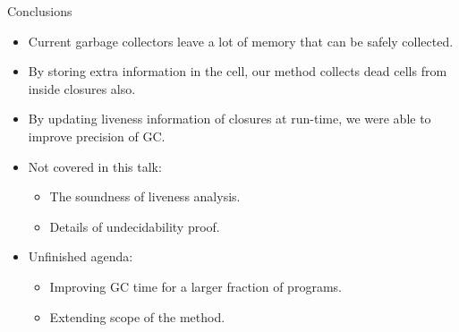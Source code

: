 \documentclass[xcolor=x11names,compress,mathserif]{beamer}
\renewcommand{\(}{\begin{columns}}
\renewcommand{\)}{\end{columns}}
\newcommand{\<}[1]{\begin{column}{#1}}
\renewcommand{\>}{\end{column}}
\begin{document}
\begin{frame}{Conclusions}
  \begin{itemize}\itemsep1em
  \item Current garbage collectors leave a lot of memory that can be safely collected. 
  \item By storing extra information in the cell, our method collects dead cells from inside closures also.
  \item By updating liveness information of closures at run-time, we were able to improve precision of GC.
  \item Not covered in this talk:
    \begin{itemize}
    \item The soundness of liveness analysis.
    \item Details of undecidability proof.
    \end{itemize}
    \item Unfinished agenda:
      \begin{itemize}
      \item Improving GC time for a larger fraction of programs.
      \item Extending scope of the method.
    \end{itemize}
  \end{itemize}
\end{frame}
\end{document}
